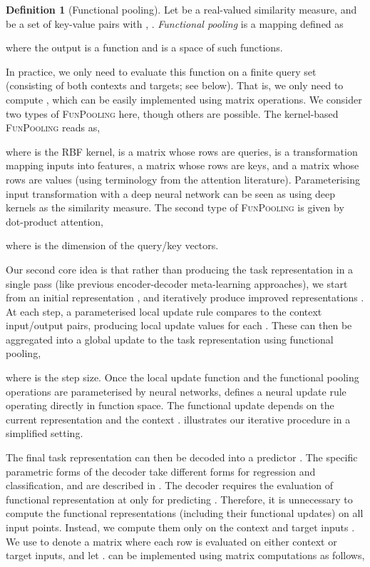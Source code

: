 \documentclass{article}
\theoremstyle{definition}
\newtheorem{definition}{Definition}[section]
\begin{document}
\theoremstyle{definition}
\begin{definition}[Functional pooling] Let  be a real-valued similarity measure, and  be a set of key-value pairs with , . \emph{Functional pooling} is a mapping  defined as

where the output is a function  and  is a space of such functions. 
\end{definition}

In practice, we only need to evaluate this function on a finite query set  (consisting of both contexts and targets; see below). That is, we only need to compute , which can be easily implemented using matrix operations. 
We consider two types of \textsc{FunPooling} here, though others are possible. The kernel-based \textsc{FunPooling} reads as,

where  is the RBF kernel,  is a matrix whose rows are queries,   is a  transformation mapping inputs into features,   a matrix whose rows are keys, and  a matrix whose rows are values (using terminology from the attention literature). Parameterising input transformation  with a deep neural network can be seen as using deep kernels \citep{wilson2016deep} as the similarity measure.
The second type of \textsc{FunPooling} is given by dot-product attention,

where  is the dimension of the query/key vectors.

Our second core idea is that rather than producing the task representation in a single pass (like  previous encoder-decoder meta-learning approaches), we start from an initial representation , and iteratively produce improved representations . 
At each step, a parameterised local update rule  compares  to the context input/output pairs, producing local update values  for each . These can then be aggregated into a global update to the task representation using functional pooling,

where  is the step size. 
Once the local update function  and the functional pooling operations are parameterised by neural networks,  defines a  neural update rule operating directly in function space. The functional update  depends on the current representation  and the context .  illustrates our iterative procedure in a simplified setting.

The final task representation can then be decoded into a predictor   . 
The specific parametric forms of the decoder take different forms for regression and classification, and are described in . The decoder requires the evaluation of functional representation  at  only for predicting . Therefore, it is unnecessary to compute the functional representations  (including their functional updates) on all input points. Instead, we compute them only on the context  and target inputs . We use  to denote a matrix where each row is  evaluated on either context or target inputs, and let .
 can be implemented using matrix computations as follows,
\end{document}
